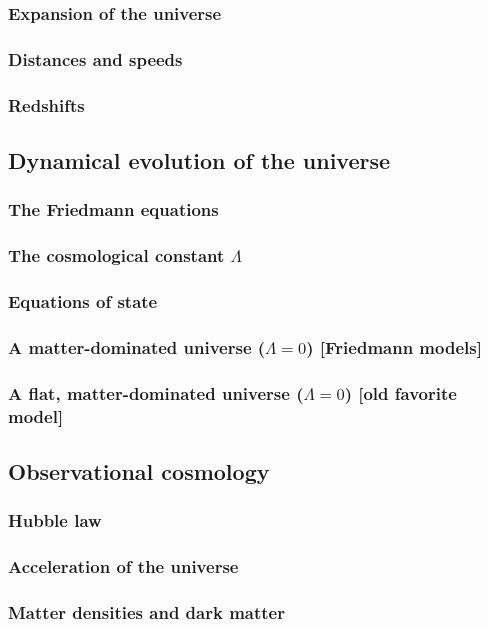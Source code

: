 \documentclass{article}
\theoremstyle{definition}
\begin{document}
\subsubsection{Expansion of the universe}
\subsubsection{Distances and speeds}
\subsubsection{Redshifts}
\subsection{Dynamical evolution of the universe}
\subsubsection{The Friedmann equations}
\subsubsection{The cosmological constant $\Lambda$}
\subsubsection{Equations of state}
\subsubsection{A matter-dominated universe ($\Lambda = 0$) [Friedmann models]}
\subsubsection{A flat, matter-dominated universe ($\Lambda = 0$) [old favorite model]}
\subsection{Observational cosmology}
\subsubsection{Hubble law}
\subsubsection{Acceleration of the universe}
\subsubsection{Matter densities and dark matter}
\end{document}
